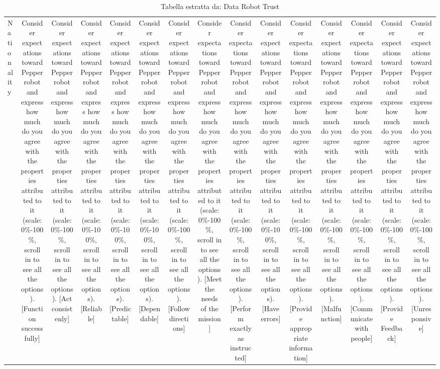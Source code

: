 \begin{table}[htbp]
\caption{Tabella estratta da: Data Robot Trust}
\label{tab:data_robot_trust}
\begin{tabular}{lcccccccccccccc}
\toprule
Nationality & Consider expectations toward Pepper robot and express how much do you agree with the properties attributed to it (scale: 0\%-100\%, scroll in to see all the options).  [Function successfully] & Consider expectations toward Pepper robot and express how much do you agree with the properties attributed to it (scale: 0\%-100\%, scroll in to see all the options).  [Act consistenly] & Consider expectations toward Pepper robot and express how much do you agree with the properties attributed to it (scale: 0\%-100\%, scroll in to see all the options).  [Reliable] & Consider expectations toward Pepper robot and express how much do you agree with the properties attributed to it (scale: 0\%-100\%, scroll in to see all the options).  [Predictable] & Consider expectations toward Pepper robot and express how much do you agree with the properties attributed to it (scale: 0\%-100\%, scroll in to see all the options).  [Dependable] & Consider expectations toward Pepper robot and express how much do you agree with the properties attributed to it (scale: 0\%-100\%, scroll in to see all the options).  [Follow directions] & Consider expectations toward Pepper robot and express how much do you agree with the properties attributed to it (scale: 0\%-100\%, scroll in to see all the options).  [Meet the needs of the mission] & Consider expectations toward Pepper robot and express how much do you agree with the properties attributed to it (scale: 0\%-100\%, scroll in to see all the options).  [Perform exactly as instructed] & Consider expectations toward Pepper robot and express how much do you agree with the properties attributed to it (scale: 0\%-100\%, scroll in to see all the options).  [Have errors] & Consider expectations toward Pepper robot and express how much do you agree with the properties attributed to it (scale: 0\%-100\%, scroll in to see all the options).  [Provide appropriate information] & Consider expectations toward Pepper robot and express how much do you agree with the properties attributed to it (scale: 0\%-100\%, scroll in to see all the options).  [Malfunction] & Consider expectations toward Pepper robot and express how much do you agree with the properties attributed to it (scale: 0\%-100\%, scroll in to see all the options).  [Communicate with people] & Consider expectations toward Pepper robot and express how much do you agree with the properties attributed to it (scale: 0\%-100\%, scroll in to see all the options).  [Provide Feedback] & Consider expectations toward Pepper robot and express how much do you agree with the properties attributed to it (scale: 0\%-100\%, scroll in to see all the options).  [Unresponsive] \\

\end{tabular}
\end{table}

